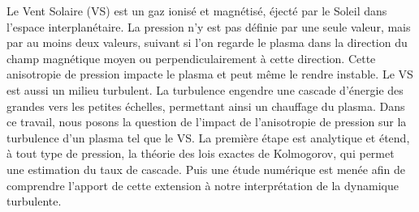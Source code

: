 	Le Vent Solaire (VS) est un gaz ionisé et magnétisé, éjecté par le Soleil dans l’espace interplanétaire. La pression n’y est pas définie par une seule valeur, mais par au moins deux valeurs, suivant si l’on regarde le plasma dans la direction du champ magnétique moyen ou perpendiculairement à cette direction. Cette anisotropie de pression impacte le plasma et peut même le rendre instable. Le VS est aussi un milieu turbulent. La turbulence engendre une cascade d’énergie des grandes vers les petites échelles, permettant ainsi un chauffage du plasma. Dans ce travail, nous posons la question de l’impact de l’anisotropie de pression sur la turbulence d’un plasma tel que le VS. La première étape est analytique et étend, à tout type de pression, la théorie des lois exactes de Kolmogorov, qui permet une estimation du taux de cascade. Puis une étude numérique est menée afin de comprendre l’apport de cette extension à notre interprétation de la dynamique turbulente.
